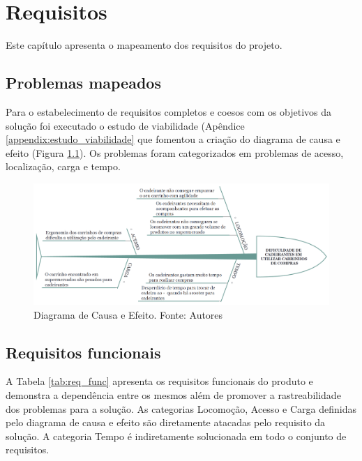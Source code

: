 


\chapter{Requisitos}

Este capítulo apresenta o mapeamento dos requisitos do projeto.

\section{Problemas mapeados}

Para o estabelecimento de requisitos completos e coesos com os objetivos da solução foi executado o estudo de viabilidade (Apêndice \ref{appendix:estudo_viabilidade} que fomentou a criação do diagrama de causa e efeito (Figura \ref{fig:causa_e_efeito}). Os problemas foram categorizados em problemas de acesso, localização, carga e tempo.

\begin{figure}[hb]
		\centering
		\includegraphics[width=1\textwidth]{figuras/diagramaefeito.png}
		\caption{Diagrama de Causa e Efeito. Fonte: Autores}
		\label{fig:causa_e_efeito}
\end{figure} 

\section{Requisitos funcionais}

A Tabela \ref{tab:req_func} apresenta os requisitos funcionais do produto e demonstra a dependência entre os mesmos além de promover a rastreabilidade dos problemas para a solução.  As categorias Locomoção, Acesso e Carga definidas pelo diagrama de causa e efeito são diretamente atacadas pelo requisito da solução. A categoria Tempo é indiretamente solucionada em todo o conjunto de requisitos.


